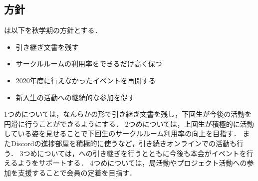 \subsection*{\newGradeIfKouki{}\thirdGrade{}方針}


\thirdGrade{}は以下を秋学期の方針とする．

\begin{itemize}
    \item 引き継ぎ文書を残す
    \item サークルルームの利用率をできるだけ高く保つ
    \item 2020年度に行えなかったイベントを再開する
    \item 新入生の活動への継続的な参加を促す
\end{itemize}

1つめについては，なんらかの形で引き継ぎ文書を残し，下回生が今後の活動を円滑に行うことができるようにする．
2つめについては，上回生が積極的に活動している姿を見せることで下回生のサークルルーム利用率の向上を目指す．
またDiscordの進捗部屋を積極的に使うなど，引き続きオンラインでの活動も行う．
3つめについては，\secondGrade{}への引き継ぎを行うとともに今後も本会がイベントを行えるよう\secondGrade{}をサポートする．
4つめについては，局活動やプロジェクト活動への参加を支援することで会員の定着を目指す．

